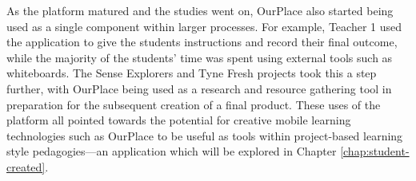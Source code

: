 As the platform matured and the studies went on, OurPlace also started being used as a single component within larger processes. For example, Teacher 1 used the application to give the students instructions and record their final outcome, while the majority of the students’ time was spent using external tools such as whiteboards. The Sense Explorers and Tyne Fresh projects took this a step further, with OurPlace being used as a research and resource gathering tool in preparation for the subsequent creation of a final product. These uses of the platform all pointed towards the potential for creative mobile learning technologies such as OurPlace to be useful as tools within project-based learning style pedagogies---an application which will be explored in Chapter \ref{chap:student-created}.